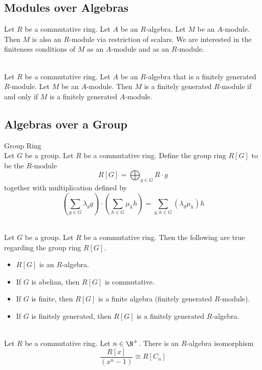 \documentclass[a4paper]{article}
\begin{document}
\subsection{Modules over Algebras}
Let $R$ be a commutative ring. Let $A$ be an $R$-algebra. Let $M$ be an $A$-module. Then $M$ is also an $R$-module via restriction of scalars. We are interested in the finiteness conditions of $M$ as an $A$-module and as an $R$-module. 

\begin{prp}{}{}\\
Let $R$ be a commutative ring. Let $A$ be an $R$-algebra that is a finitely generated $R$-module. Let $M$ be an $A$-module. Then $M$ is a finitely generated $R$-module if and only if $M$ is a finitely generated $A$-module. 
\end{prp}

\subsection{Algebras over a Group}
\begin{defn}{Group Ring}{}\\
Let $G$ be a group. Let $R$ be a commutative ring. Define the group ring $R[G]$ to be the $R$-module $$R[G]=\bigoplus_{g\in G}R\cdot g$$ together with multiplication defined by $$\left(\sum_{g\in G}\lambda_gg\right)\cdot\left(\sum_{h\in G}\mu_h h\right)=\sum_{g,h\in G}(\lambda_g\mu_h)h$$
\end{defn}

\begin{lmm}{}{}\\
Let $G$ be a group. Let $R$ be a commutative ring. Then the following are true regarding the group ring $R[G]$. 
\begin{itemize}
\item $R[G]$ is an $R$-algebra. 
\item If $G$ is abelian, then $R[G]$ is commutative. 
\item If $G$ is finite, then $R[G]$ is a finite algebra (finitely generated $R$-module). 
\item If $G$ is finitely generated, then $R[G]$ is a finitely generated $R$-algebra. 
\end{itemize}
\end{lmm}

\begin{eg}{}{}\\
Let $R$ be a commutative ring. Let $n\in\N^+$. There is an $R$-algebra isomorphism $$\frac{R[x]}{(x^n-1)}\cong R[C_n]$$
\end{eg}
\end{document}
